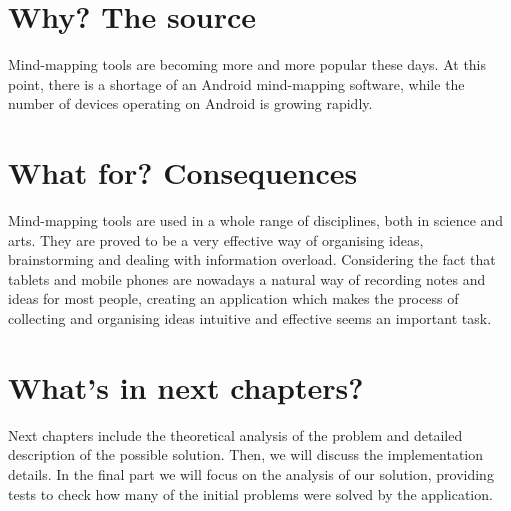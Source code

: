 \section{Why? The source}
\label{sec:why}

Mind-mapping tools are becoming more and more popular these days. At this point, there is a shortage of an Android mind-mapping software, while the number of devices operating on Android is growing rapidly.

\section{What for? Consequences}
\label{sec:whatfor}

Mind-mapping tools are used in a whole range of disciplines, both in science and arts. They are proved to be a very effective way of organising ideas, brainstorming and dealing with information overload. Considering the fact that tablets and mobile phones are nowadays a natural way of recording notes and ideas for most people, creating an application which makes the process of collecting and organising ideas intuitive and effective seems an important task.

\section{What's in next chapters?}
\label{sec:nextchapters}

Next chapters include the theoretical analysis of the problem and detailed description of the possible solution. Then, we will discuss the implementation details. In the final part we will focus on the analysis of our solution, providing tests to check how many of the initial problems were solved by the application.

